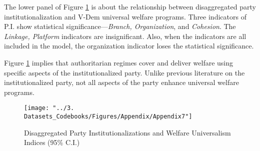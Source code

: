 \documentclass[12pt]{article}
\begin{document}
	The lower panel of Figure \ref{fig:plot4} is about the relationship between disaggregated party institutionalization and V-Dem universal welfare programs. Three indicators of P.I. show statistical significance---\textit{Branch, Organization}, and \textit{Cohesion}. The \textit{Linkage, Platform} indicators are insignificant. Also, when the indicators are all included in the model, the organization indicator loses the statistical significance.
	
	Figure \ref{fig:plot4} implies that authoritarian regimes cover and deliver welfare using specific aspects of the institutionalized party. Unlike previous literature on the institutionalized party, not all aspects of the party enhance universal welfare programs.
	
	\begin{figure}[!htbt]
		\centering
		\texttt{[image: "../3. Datasets\_Codebooks/Figures/Appendix/Appendix7"]}
		\caption{Disaggregated Party Institutionalizations and Welfare Universalism Indices (95\% C.I.)}
		\label{fig:plot4}
	\end{figure}
	
	
	
\end{document}
